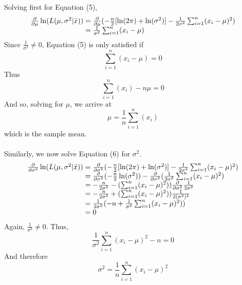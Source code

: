 \documentclass[10pt]{article}
\begin{document}
\newpage
Solving first for Equation (5),
\begin{equation}
\begin{array}{l@{{}={}}l}
\frac{\partial}{\partial \mu} \ln(L(\mu,\sigma^2 | \bar{x}))
& \frac{\partial}{\partial \mu} (-\frac{n}{2}[\ln(2\pi)+\ln(\sigma^2)] -\frac{1}{2\sigma^2}\sum_{i=1}^{n}(x_{i} - \mu)^2) \\
& \frac{1}{\sigma^2}\sum_{i=1}^{n}(x_{i} - \mu)
\end{array}
\end{equation}
Since $\frac{1}{\sigma^2} \neq 0$, Equation (5) is only satisfied if
\begin{equation}
\sum_{i=1}^{n}(x_{i} - \mu) = 0
\end{equation}
Thus
\begin{equation}
\sum_{i=1}^{n}(x_{i}) - n\mu = 0
\end{equation}
And so, solving for $\mu$, we arrive at 
\begin{equation}
\mu = \frac{1}{n}\sum_{i=1}^{n}(x_{i})
\end{equation}
which is the sample mean.\\
\\
Similarly, we now solve Equation (6) for $\sigma^2$.
\begin{equation}
\begin{array}{l@{{}={}}l}
\frac{\partial}{\partial \sigma^2} \ln(L(\mu,\sigma^2 | \bar{x}))
& \frac{\partial}{\partial \sigma^2} (-\frac{n}{2}[\ln(2\pi)+\ln(\sigma^2)] -\frac{1}{2\sigma^2}\sum_{i=1}^{n}(x_{i} - \mu)^2) \\
&\frac{\partial}{\partial \sigma^2}(-\frac{n}{2}\ln(\sigma^2)) - \frac{\partial}{\partial \sigma^2}(\frac{1}{2\sigma^2}\sum_{i=1}^{n}(x_{i} - \mu)^2)\\
& -\frac{n}{2\sigma^2} -(\sum_{i=1}^{n}(x_{i} - \mu)^2))\frac{\partial}{\partial \sigma^2}\frac{1}{2\sigma^2}\\
&  -\frac{n}{2\sigma^2} + (\sum_{i=1}^{n}(x_{i} - \mu)^2))\frac{1}{2(\sigma^{2})^{2}}\\
& \frac{1}{2\sigma^2}(-n + \frac{1}{\sigma^2}\sum_{i=1}^{n}(x_{i} - \mu)^2))\\
& 0
\end{array}
\end{equation}
Again, $\frac{1}{\sigma^2} \neq 0$. Thus,
\begin{equation}
\frac{1}{\sigma^2}\sum_{i=1}^{n}(x_{i} - \mu)^2 - n = 0 
\end{equation}
And therefore
\begin{equation}
\sigma^2 = \frac{1}{n}\sum_{i=1}^{n}(x_{i} - \mu)^2
\end{equation}
\end{document}
